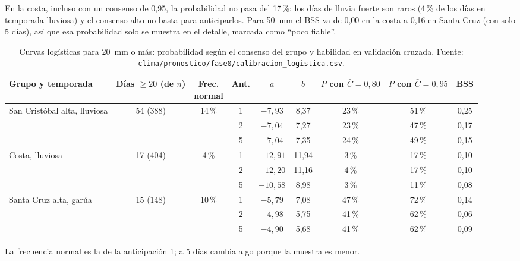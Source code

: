 \documentclass{sosg-informe}
\begin{document}
En la costa, incluso con un consenso de 0,95, la probabilidad no pasa del 17\,\%: los días de lluvia fuerte son raros (4\,\% de los días en temporada lluviosa) y el consenso alto no basta para anticiparlos. Para 50~mm el BSS va de 0,00 en la costa a 0,16 en Santa Cruz (con solo 5 días), así que esa probabilidad solo se muestra en el detalle, marcada como \enquote{poco fiable}.

\begin{table}[ht]
  \centering\small
  \caption{Curvas logísticas para 20~mm o más: probabilidad según el consenso del grupo y habilidad en validación cruzada. Fuente: \texttt{clima/pronostico/fase0/calibracion\_logistica.csv}.}
  \label{tab:cal}
  \begin{tabularx}{\linewidth}{>{\raggedright\arraybackslash}Xcccccccc}
    \toprule
    Grupo y temporada & \makecell{Días $\geq 20$\\(de $n$)} & \makecell{Frec.\\normal} & Ant. & $a$ & $b$ & \makecell{$P$ con\\$\bar C = 0{,}80$} & \makecell{$P$ con\\$\bar C = 0{,}95$} & BSS \\
    \midrule
    San Cristóbal alta, lluviosa & 54 (388) & 14\,\% & 1 & $-7{,}93$ & 8,37 & 23\,\% & 51\,\% & 0,25 \\
    & & & 2 & $-7{,}04$ & 7,27 & 23\,\% & 47\,\% & 0,17 \\
    & & & 5 & $-7{,}04$ & 7,35 & 24\,\% & 49\,\% & 0,15 \\
    \addlinespace
    Costa, lluviosa & 17 (404) & 4\,\% & 1 & $-12{,}91$ & 11,94 & 3\,\% & 17\,\% & 0,10 \\
    & & & 2 & $-12{,}20$ & 11,16 & 4\,\% & 17\,\% & 0,10 \\
    & & & 5 & $-10{,}58$ & 8,98 & 3\,\% & 11\,\% & 0,08 \\
    \addlinespace
    Santa Cruz alta, garúa & 15 (148) & 10\,\% & 1 & $-5{,}79$ & 7,08 & 47\,\% & 72\,\% & 0,14 \\
    & & & 2 & $-4{,}98$ & 5,75 & 41\,\% & 62\,\% & 0,06 \\
    & & & 5 & $-4{,}90$ & 5,68 & 41\,\% & 62\,\% & 0,09 \\
    \bottomrule
  \end{tabularx}
  \par\vspace{3pt}\raggedright\footnotesize La frecuencia normal es la de la anticipación 1; a 5 días cambia algo porque la muestra es menor.
\end{table}
\end{document}
